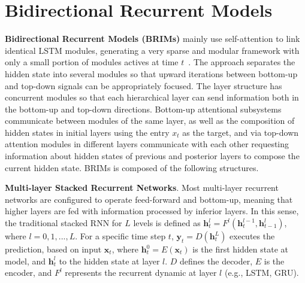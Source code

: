 \section{Bidirectional Recurrent Models}
\label{sec:preliminaries}

\textbf{Bidirectional Recurrent Models (BRIMs)} mainly use self-attention to link identical LSTM modules, generating a very sparse and modular framework with only a small portion of modules actives at time $t$~\cite{mittal2020learning}. The approach separates the hidden state into several modules so that upward iterations between bottom-up and top-down signals can be appropriately focused. The layer structure has concurrent modules so that each hierarchical layer can send information both in the bottom-up and top-down directions. Bottom-up attentional subsystems communicate between modules of the same layer, as well as the composition of hidden states in initial layers using the entry $x_{t}$ as the target, and via top-down attention modules in different layers communicate with each other requesting information about hidden states of previous and posterior layers to compose the current hidden state. BRIMs is composed of the following structures.

\textbf{Multi-layer Stacked Recurrent Networks}. Most multi-layer recurrent networks are configured to operate feed-forward and bottom-up, meaning that higher layers are fed with information processed by inferior layers. In this sense, the traditional stacked RNN for $L$ levels is defined as $\textbf{h}_t^l = F^l(\textbf{h}_t^{l-1}, \textbf{h}_{t-1}^l)$, where $l = 0, 1, ..., L$. For a specific time step $t$, $\textbf{y}_t = D(\textbf{h}_t^L)$ executes the prediction, based on input $\textbf{x}_t$, where $\textbf{h}_t^0 = E(\textbf{x}_t)$ is the first hidden state at model, and $\textbf{h}_t^l$ to the hidden state at layer $l$. $D$ defines the decoder, $E$ is the encoder, and $F^l$ represents the recurrent dynamic at layer $l$ (e.g., LSTM, GRU).




